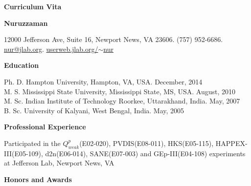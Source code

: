 
\begin{center}
\textbf{Curriculum Vita}\\
\end{center}

\begin{center}
{\fontsize{16}{16}\selectfont\bf Nuruzzaman}
\end{center} 


\begin{singlespace}
\noindent
\small 12000 Jefferson Ave, Suite 16, Newport News, VA 23606. (757) 952-6686. \href{mailto:nur@jlab.org}{nur@jlab.org}. \href{http://userweb.jlab.org/~nur}{userweb.jlab.org/$\sim$nur}
\begin{center}
\large{\textbf{Education}}
\end{center}
\vspace{-5pt}

\noindent
Ph. D. \hspace{0.10cm} Hampton University, Hampton, VA, USA. \hfill December, 2014 \\
\noindent
M. S. \hspace{0.30cm} Mississippi State University, Mississippi State, MS, USA. \hfill August, 2010 \\
\noindent
M. Sc. \hspace{0.10cm} Indian Institute of Technology Roorkee, Uttarakhand, India. \hfill May, 2007 \\
\noindent
B. Sc. \hspace{0.15cm} University of Kalyani, West Bengal, India. \hfill May, 2005 

\begin{center}
\large{\textbf{Professional Experience}}
\end{center}
\vspace{-5pt}

\noindent
Participated in the $Q^p_{weak}$(E02-020), PVDIS(E08-011), HKS(E05-115), HAPPEX-III(E05-109), d2n(E06-014), SANE(E07-003) and GEp-III(E04-108) experiments at Jefferson Lab, Newport News, VA

\begin{center}
\large{\textbf{Honors and Awards}}
\end{center}
\vspace{-23pt}

\begin{changemargin}{-12pt}{0in} 
\begin{itemize}
\setlength{\itemsep}{-1pt}


\end{itemize}
\end{changemargin}
\end{singlespace}
